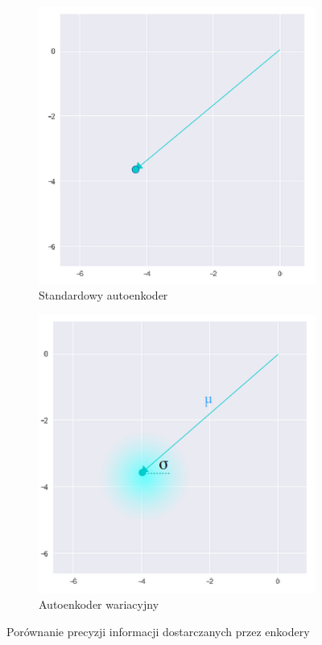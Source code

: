 \begin{figure}[h!]
  \centering
  \begin{subfigure}[b]{0.4\linewidth}
    \includegraphics[width=1.0\textwidth]{images/vae_vs_stand_a}
    \caption{Standardowy autoenkoder}
  \end{subfigure}
  \begin{subfigure}[b]{0.4\linewidth}
    \includegraphics[width=1.0\textwidth]{images/vae_vs_stand_b}
    \caption{Autoenkoder wariacyjny}
  \end{subfigure}
  \caption{Porównanie precyzji informacji dostarczanych przez enkodery}
  \label{fig:vae_vs_stand}
\end{figure}

